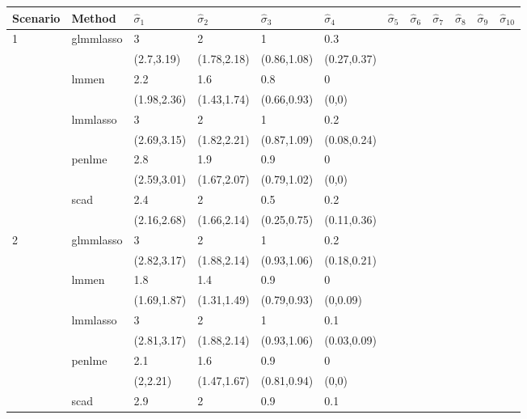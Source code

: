 \documentclass[varwidth, border={10 5 600 5}]{standalone}
\begin{document}
\begin{table}[ht]
\centering
\begin{tabular}{llllllllllll}
  \hline
Scenario & Method & $\hat{\sigma}_{1}$ & $\hat{\sigma}_{2}$ & $\hat{\sigma}_{3}$ & $\hat{\sigma}_{4}$ & $\hat{\sigma}_{5}$ & $\hat{\sigma}_{6}$ & $\hat{\sigma}_{7}$ & $\hat{\sigma}_{8}$ & $\hat{\sigma}_{9}$ & $\hat{\sigma}_{10}$ \\ 
  \hline
\multirow{10}{*}{1} & \multirow{2}{*}{glmmlasso} & 3 & 2 & 1 & 0.3 &  &  &  &  &  &  \\ 
   &  & (2.7,3.19) & (1.78,2.18) & (0.86,1.08) & (0.27,0.37) &  &  &  &  &  &  \\ 
   & \multirow{2}{*}{lmmen} & 2.2 & 1.6 & 0.8 & 0 &  &  &  &  &  &  \\ 
   &  & (1.98,2.36) & (1.43,1.74) & (0.66,0.93) & (0,0) &  &  &  &  &  &  \\ 
   & \multirow{2}{*}{lmmlasso} & 3 & 2 & 1 & 0.2 &  &  &  &  &  &  \\ 
   &  & (2.69,3.15) & (1.82,2.21) & (0.87,1.09) & (0.08,0.24) &  &  &  &  &  &  \\ 
   & \multirow{2}{*}{penlme} & 2.8 & 1.9 & 0.9 & 0 &  &  &  &  &  &  \\ 
   &  & (2.59,3.01) & (1.67,2.07) & (0.79,1.02) & (0,0) &  &  &  &  &  &  \\ 
   & \multirow{2}{*}{scad} & 2.4 & 2 & 0.5 & 0.2 &  &  &  &  &  &  \\ 
   &  & (2.16,2.68) & (1.66,2.14) & (0.25,0.75) & (0.11,0.36) &  &  &  &  &  &  \\ 
  \multirow{10}{*}{2} & \multirow{2}{*}{glmmlasso} & 3 & 2 & 1 & 0.2 &  &  &  &  &  &  \\ 
   &  & (2.82,3.17) & (1.88,2.14) & (0.93,1.06) & (0.18,0.21) &  &  &  &  &  &  \\ 
   & \multirow{2}{*}{lmmen} & 1.8 & 1.4 & 0.9 & 0 &  &  &  &  &  &  \\ 
   &  & (1.69,1.87) & (1.31,1.49) & (0.79,0.93) & (0,0.09) &  &  &  &  &  &  \\ 
   & \multirow{2}{*}{lmmlasso} & 3 & 2 & 1 & 0.1 &  &  &  &  &  &  \\ 
   &  & (2.81,3.17) & (1.88,2.14) & (0.93,1.06) & (0.03,0.09) &  &  &  &  &  &  \\ 
   & \multirow{2}{*}{penlme} & 2.1 & 1.6 & 0.9 & 0 &  &  &  &  &  &  \\ 
   &  & (2,2.21) & (1.47,1.67) & (0.81,0.94) & (0,0) &  &  &  &  &  &  \\ 
   & \multirow{2}{*}{scad} & 2.9 & 2 & 0.9 & 0.1 &  &  &  &  &  &  \\ 

\end{tabular}
\end{table}
\end{document}
